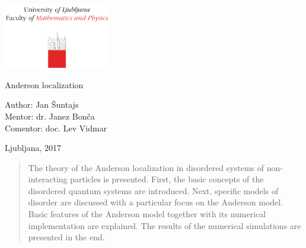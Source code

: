 \documentclass[10pt,a4paper]{article}
\begin{document}


\begin{center}

\includegraphics[width=0.35\textwidth]{logo_fmf_uni-lj_en.pdf}\\[8ex] 

\vspace{3mm}


\vspace{2 cm}

{ \Large }Anderson localization\\             
\vspace{3cm}


{\large Author: Jan Šuntajs\\
\large Mentor: dr. Janez Bonča \\
\large Comentor: doc. Lev Vidmar 
\vspace{2cm}



Ljubljana, 2017}
\vfill
\begin{abstract}
The theory of the Anderson localization in disordered systems of non-interacting particles is presented. First, the basic concepts of the disordered quantum systems are introduced. Next, specific models of disorder are discussed with a particular focus on the Anderson model. Basic features of the Anderson model together with its numerical implementation are explained. The results of the numerical simulations are presented in the end.  

\end{abstract}

\end{center}

\cleardoublepage

\thispagestyle{empty}


\clearpage
\pagestyle{fancy}
\fancyhf{}
\cfoot{\thepage}
\setcounter{page}{1}
\end{document}
